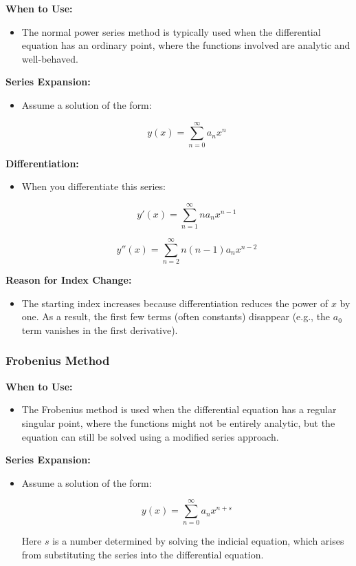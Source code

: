 \textbf{When to Use:}
\begin{itemize}
    \item The normal power series method is typically used when the differential equation has an ordinary point, where the functions involved are analytic and well-behaved.
\end{itemize}

\textbf{Series Expansion:}
\begin{itemize}
    \item Assume a solution of the form:
    

$$ y(x) = \sum_{n=0}^{\infty} a_n x^n $$


\end{itemize}

\textbf{Differentiation:}
\begin{itemize}
    \item When you differentiate this series:
    

$$ y'(x) = \sum_{n=1}^{\infty} n a_n x^{n-1} $$ 


    

$$ y''(x) = \sum_{n=2}^{\infty} n(n-1) a_n x^{n-2} $$ 


\end{itemize}

\textbf{Reason for Index Change:}
\begin{itemize}
    \item The starting index increases because differentiation reduces the power of $ x $ by one. As a result, the first few terms (often constants) disappear (e.g., the $ a_0 $ term vanishes in the first derivative).
\end{itemize}


\subsubsection{Frobenius Method}

\textbf{When to Use:}
\begin{itemize}
    \item The Frobenius method is used when the differential equation has a regular singular point, where the functions might not be entirely analytic, but the equation can still be solved using a modified series approach.
\end{itemize}

\textbf{Series Expansion:}
\begin{itemize}
    \item Assume a solution of the form:
    

\[
    y(x) = \sum_{n=0}^{\infty} a_n x^{n+s}
    \]


    Here \( s \) is a number determined by solving the indicial equation, which arises from substituting the series into the differential equation.
\end{itemize}

